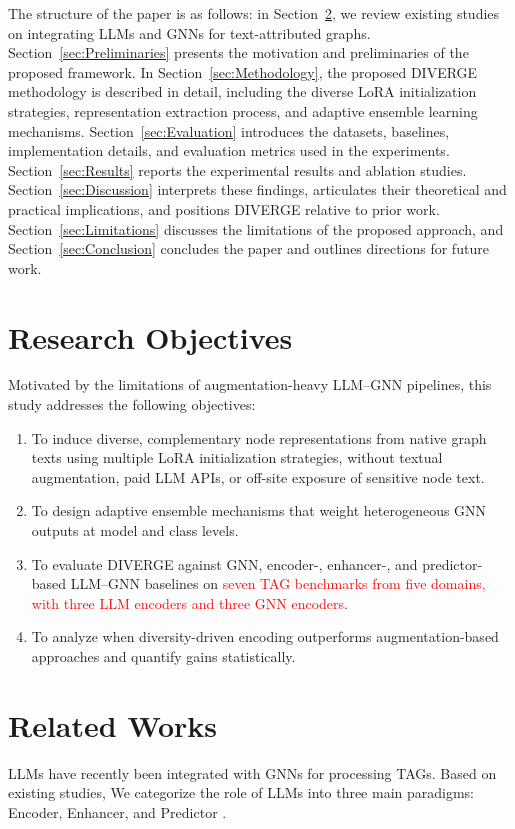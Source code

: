 \documentclass[a4paper,fleqn]{cas-sc}
\newcommand{\revone}[1]{\textcolor{red}{#1}}   %
\begin{document}
The structure of the paper is as follows: in Section~\ref{sec:relatedWork}, we review existing studies on integrating LLMs and GNNs for text-attributed graphs. Section~\ref{sec:Preliminaries} presents the motivation and preliminaries of the proposed framework. In Section~\ref{sec:Methodology}, the proposed DIVERGE methodology is described in detail, including the diverse LoRA initialization strategies, representation extraction process, and adaptive ensemble learning mechanisms. Section~\ref{sec:Evaluation} introduces the datasets, baselines, implementation details, and evaluation metrics used in the experiments. Section~\ref{sec:Results} reports the experimental results and ablation studies. Section~\ref{sec:Discussion} interprets these findings, articulates their theoretical and practical implications, and positions DIVERGE relative to prior work. Section~\ref{sec:Limitations} discusses the limitations of the proposed approach, and Section~\ref{sec:Conclusion} concludes the paper and outlines directions for future work.


\section{Research Objectives}\label{sec:researchObjectives}
Motivated by the limitations of augmentation-heavy LLM--GNN pipelines, this study addresses the following objectives:
\begin{enumerate}
    \item To induce diverse, complementary node representations from native graph texts using multiple LoRA initialization strategies, without textual augmentation, paid LLM APIs, or off-site exposure of sensitive node text.
    \item To design adaptive ensemble mechanisms that weight heterogeneous GNN outputs at model and class levels.
    \item To evaluate DIVERGE against GNN, encoder-, enhancer-, and predictor-based LLM--GNN baselines on \revone{seven TAG benchmarks from five domains, with three LLM encoders and three GNN encoders}.
    \item To analyze when diversity-driven encoding outperforms augmentation-based approaches and quantify gains statistically.
\end{enumerate}

\section{Related Works}\label{sec:relatedWork}
LLMs have recently been integrated with GNNs for processing TAGs. Based on existing studies, We categorize the role of LLMs into three main paradigms: Encoder, Enhancer, and Predictor \citep{Wu2025LLMNode, Jin2023LLMGraphs, Chen2024LLMGraphs, Li2024GraphLLMSurvey}.
\end{document}
